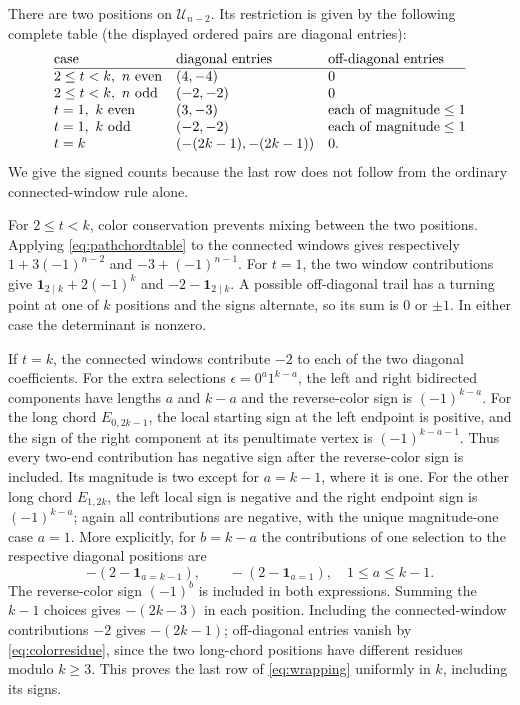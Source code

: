 There are two positions on $\mathcal U_{n-2}$. Its restriction
is given by the following complete table (the displayed ordered
pairs are diagonal entries):
\begin{equation}\label{eq:wrapping}
\begin{array}{@{}lll@{}}
 \text{case}&\text{diagonal entries}&\text{off-diagonal entries}\\\hline
 2\le t<k,\ n\text{ even}&(4,-4)&0\\
 2\le t<k,\ n\text{ odd}&(-2,-2)&0\\
 t=1,\ k\text{ even}&(3,-3)&\text{each of magnitude}\le1\\
 t=1,\ k\text{ odd}&(-2,-2)&\text{each of magnitude}\le1\\
 t=k&(-(2k-1),-(2k-1))&0.
\end{array}
\end{equation}
We give the signed counts because the last row does not follow
from the ordinary connected-window rule alone.

For $2\le t<k$, color conservation prevents mixing between the
two positions. Applying \eqref{eq:pathchordtable} to the
connected windows gives respectively
$1+3(-1)^{n-2}$ and $-3+(-1)^{n-1}$.
For $t=1$, the two window contributions give
$\mathbf1_{2\mid k}+2(-1)^k$ and
$-2-\mathbf1_{2\mid k}$. A possible off-diagonal trail has a
turning point at one of $k$ positions and the signs alternate,
so its sum is $0$ or $\pm1$. In either case the determinant is
nonzero.

If $t=k$, the connected windows contribute $-2$ to each
of the two diagonal coefficients. For the extra selections
$\epsilon=0^a1^{k-a}$, the left and right bidirected components
have lengths $a$ and $k-a$ and the reverse-color sign is
$(-1)^{k-a}$. For the long chord $E_{0,2k-1}$, the local
starting sign at the left endpoint is positive, and the sign of
the right component at its penultimate vertex is
$(-1)^{k-a-1}$. Thus every two-end contribution has negative
sign after the reverse-color sign is included. Its magnitude
is two except for $a=k-1$, where it is one. For the other long
chord $E_{1,2k}$, the left local sign is negative and the right
endpoint sign is $(-1)^{k-a}$; again all contributions are
negative, with the unique magnitude-one case $a=1$. More explicitly, for $b=k-a$ the contributions of one
selection to the respective diagonal positions are
\begin{equation}\label{eq:uniform-wrap-selections}
 -(2-\mathbf1_{a=k-1}),\qquad
 -(2-\mathbf1_{a=1}),\quad 1\le a\le k-1.
\end{equation}
The reverse-color sign $(-1)^b$ is included in both expressions.
Summing the $k-1$ choices gives $-(2k-3)$ in each position.
Including the connected-window contributions $-2$ gives
$-(2k-1)$; off-diagonal entries vanish by
\eqref{eq:colorresidue}, since the two long-chord positions
have different residues modulo $k\ge3$. This proves the
last row of \eqref{eq:wrapping} uniformly in $k$, including
its signs.

